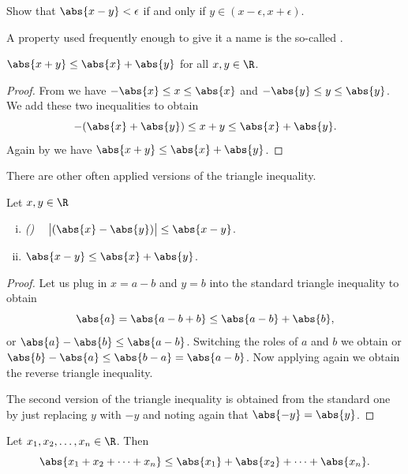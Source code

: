 \documentclass[12pt]{book}
\begin{document}
\begin{exercise}
Show that
$\abs{x-y} < \epsilon$ if and only if $y\in (x-\epsilon,x+\epsilon)$.
\end{exercise}

A property used frequently enough to give it a name is the so-called
\emph{}.

\begin{prop}
$\abs{x+y} \leq \abs{x}+\abs{y}$
for all $x, y \in \R$.
\end{prop}

\begin{proof}
From  we
have $- \abs{x} \leq x \leq \abs{x}$ and
$- \abs{y} \leq y \leq \abs{y}$.
We add these two inequalities to obtain
\begin{equation*}
- (\abs{x}+\abs{y}) \leq x+y \leq \abs{x}+ \abs{y} .
\end{equation*}
Again by  we have 
$\abs{x+y} \leq \abs{x}+\abs{y}$.
\end{proof}

There are other often applied versions of the triangle inequality.

\begin{cor}
Let $x,y \in \R$
\begin{enumerate}[(i)]
\item \emph{()}
~
$\bigl\lvert (\abs{x}-\abs{y}) \bigr\rvert \leq \abs{x-y}$.
\item $\abs{x-y} \leq \abs{x}+\abs{y}$.
\end{enumerate}
\end{cor}

\begin{proof}
Let us plug in $x=a-b$ and $y=b$ into the standard
triangle inequality to obtain
\begin{equation*}
\abs{a} = \abs{a-b+b} \leq \abs{a-b} + \abs{b} ,
\end{equation*}
or $\abs{a}-\abs{b} \leq \abs{a-b}$.
Switching the roles of $a$ and $b$
we obtain 
or $\abs{b}-\abs{a} \leq \abs{b-a} = \abs{a-b}$.
Now applying
 again we obtain the reverse triangle
inequality.

The second version of the triangle inequality is obtained from the standard
one by just replacing $y$ with $-y$ and noting again that $\abs{-y} =
\abs{y}$.
\end{proof}

\begin{cor}
Let $x_1, x_2, \ldots, x_n \in \R$.
Then
\begin{equation*}
\abs{x_1 + x_2 + \cdots + x_n} \leq 
\abs{x_1} + \abs{x_2} + \cdots + \abs{x_n} .
\end{equation*}
\end{cor}
\end{document}
